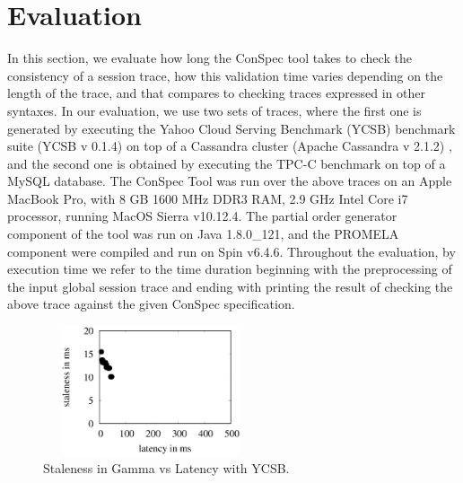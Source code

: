 \documentclass[journal, compsoc]{IEEEtran}
\begin{document}
	\section{Evaluation}\label{sec:eval}
	In this section, we evaluate how long the ConSpec tool takes to check the consistency of a  session trace, how this validation time varies depending on the length of the trace, and that compares to checking traces expressed in other syntaxes. In our evaluation, we use two sets of traces, where the first one is generated by executing the Yahoo Cloud Serving Benchmark (YCSB) benchmark suite (YCSB v 0.1.4)  \cite{Cooper:2010:BCS:1807128.1807152}   on top of a Cassandra cluster (Apache Cassandra v 2.1.2)  \cite{Lakshman:2010:CDS:1773912.1773922}, and the second one is obtained by executing the TPC-C benchmark on top of a MySQL database.
	The ConSpec Tool was run over the above traces on an Apple MacBook Pro, with 8 GB 1600 MHz DDR3 RAM,  2.9 GHz Intel Core i7 processor, %
	running MacOS Sierra v10.12.4. The partial order generator component of the tool was run on Java 1.8.0\_121, and the PROMELA component were  compiled and run on Spin v6.4.6.
	Throughout the evaluation, by execution time we refer to the time duration beginning with the preprocessing of the input global session trace and ending with printing the result of checking the above  trace against the given ConSpec specification.
	\begin{figure}%
		\includegraphics[width=2.5in,height=1.5in]
		{oneany.eps} %
		\caption{Staleness in Gamma vs Latency with YCSB.}
		\label{fig:oneany}
	\end{figure}
	
\end{document}

